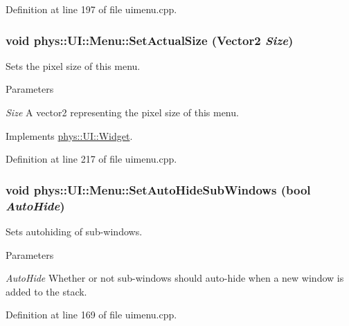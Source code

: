 Definition at line 197 of file uimenu.cpp.

\hypertarget{classphys_1_1UI_1_1Menu_aa3fc25ae8a44a7f27becc312492f5fe6}{
\subsubsection[{SetActualSize}]{\setlength{\rightskip}{0pt plus 5cm}void phys::UI::Menu::SetActualSize ({\bf Vector2} {\em Size})}}
\label{d6/dd3/classphys_1_1UI_1_1Menu_aa3fc25ae8a44a7f27becc312492f5fe6}


Sets the pixel size of this menu. 


\begin{DoxyParams}{Parameters}
\item[{\em Size}]A vector2 representing the pixel size of this menu. \end{DoxyParams}


Implements \hyperlink{classphys_1_1UI_1_1Widget_a8ceb54fd067847844b314dedd8e529f8}{phys::UI::Widget}.



Definition at line 217 of file uimenu.cpp.

\hypertarget{classphys_1_1UI_1_1Menu_a5525e3823dcd23269cd410dfb2a1e232}{
\subsubsection[{SetAutoHideSubWindows}]{\setlength{\rightskip}{0pt plus 5cm}void phys::UI::Menu::SetAutoHideSubWindows (bool {\em AutoHide})}}
\label{d6/dd3/classphys_1_1UI_1_1Menu_a5525e3823dcd23269cd410dfb2a1e232}


Sets autohiding of sub-\/windows. 


\begin{DoxyParams}{Parameters}
\item[{\em AutoHide}]Whether or not sub-\/windows should auto-\/hide when a new window is added to the stack. \end{DoxyParams}


Definition at line 169 of file uimenu.cpp.

